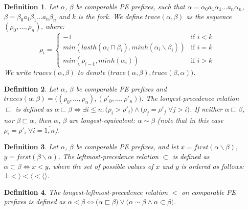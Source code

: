 \documentclass[AMA,STIX1COL]{WileyNJD-v2}
\newcommand{\Xl}{\langle}
\newcommand{\Xr}{\rangle}
\newcommand{\Xm}{\langle\!\rangle}
\newtheorem{Xdef}{Definition}
\begin{document}

    \begin{Xdef}
    Let $\alpha$, $\beta$ be comparable PE prefixes, such that
    $\alpha = \alpha_0 a_1 \alpha_1 \dots a_n \alpha_n$,
    $\beta = \beta_0 a_1 \beta_1 \dots a_n \beta_n$ and $k$ is the fork.
    We define $trace (\alpha, \beta)$ as the sequence $(\rho_0, \dots, \rho_n)$, where:
    $$
    \rho_i = \begin{cases}
        -1 &\text{if } i < k \\[-0.2em]
        min (lasth (\alpha_i \sqcap \beta_i), minh(\alpha_i \backslash \beta_i)) &\text{if } i = k \\[-0.2em]
        min (\rho_{i-1}, minh(\alpha_i)) &\text{if } i > k
    \end{cases}
    $$
    We write $traces(\alpha, \beta)$ to denote $\big( trace (\alpha, \beta), trace (\beta, \alpha) \big)$.
    \end{Xdef}

    \begin{Xdef}\label{prec1}
    Let $\alpha$, $\beta$ be comparable PE prefixes and
    $traces(\alpha, \beta) = \big( (\rho_0, \dots, \rho_n), (\rho'_0, \dots, \rho'_n) \big)$.
    The \emph{longest-precedence} relation $\sqsubset$ is defined as
    $\alpha \sqsubset \beta \Leftrightarrow \exists i \leq n:
        \big( \rho_i > \rho'_i \big) \wedge
        \big( \rho_j = \rho'_j \; \forall j > i \big)$.
    If neither $\alpha \sqsubset \beta$, nor $\beta \sqsubset \alpha$,
    then $\alpha$, $\beta$ are \emph{longest-equivalent}: $\alpha \sim \beta$
    (note that in this case $\rho_i = \rho'_i \; \forall i = \overline {1, n}$).
    \end{Xdef}

    \begin{Xdef}\label{prec2}
    Let $\alpha$, $\beta$ be comparable PE prefixes, and let
    $x = first (\alpha \backslash \beta)$,
    $y = first (\beta \backslash \alpha)$.
    The \emph{leftmost-precedence} relation $\subset$ is defined as
    $\alpha \subset \beta \Leftrightarrow x < y$, where
    the set of possible values of $x$ and $y$ is ordered as follows:
    $\bot < \Xr < \Xl < \Xm$.
    \end{Xdef}

    \begin{Xdef}\label{pe_order}
    The \emph{longest-leftmost-precedence} relation $<$ on comparable PE prefixes is defined as
    $\alpha < \beta \Leftrightarrow
        \big( \alpha \sqsubset \beta \big) \vee
        \big( \alpha \sim \beta \wedge \alpha \subset \beta \big)$.
    \end{Xdef}
\end{document}
